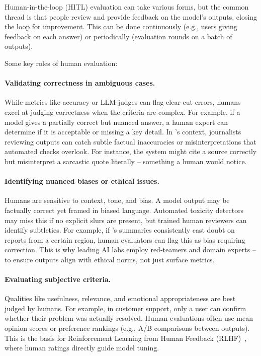 Human-in-the-loop (HITL) evaluation can take various forms, but the common thread is that people review and provide feedback on the model’s outputs, closing the loop for improvement. This can be done continuously (e.g., users giving feedback on each answer) or periodically (evaluation rounds on a batch of outputs).  

Some key roles of human evaluation:  

\paragraph*{Validating correctness in ambiguous cases.}  
While metrics like accuracy or LLM-judges can flag clear-cut errors, humans excel at judging correctness when the criteria are complex. For example, if a model gives a partially correct but nuanced answer, a human expert can determine if it is acceptable or missing a key detail. In \ishtar{}’s context, journalists reviewing outputs can catch subtle factual inaccuracies or misinterpretations that automated checks overlook. For instance, the system might cite a source correctly but misinterpret a sarcastic quote literally – something a human would notice.  

\paragraph*{Identifying nuanced biases or ethical issues.}  
Humans are sensitive to context, tone, and bias. A model output may be factually correct yet framed in biased language. Automated toxicity detectors may miss this if no explicit slurs are present, but trained human reviewers can identify subtleties. For example, if \ishtar{}’s summaries consistently cast doubt on reports from a certain region, human evaluators can flag this as bias requiring correction. This is why leading AI labs employ red-teamers and domain experts – to ensure outputs align with ethical norms, not just surface metrics.  

\paragraph*{Evaluating subjective criteria.}  
Qualities like usefulness, relevance, and emotional appropriateness are best judged by humans. For example, in customer support, only a user can confirm whether their problem was actually resolved. Human evaluations often use mean opinion scores or preference rankings (e.g., A/B comparisons between outputs). This is the basis for Reinforcement Learning from Human Feedback (RLHF)~\cite{ouyang2022instructgpt}, where human ratings directly guide model tuning.  

